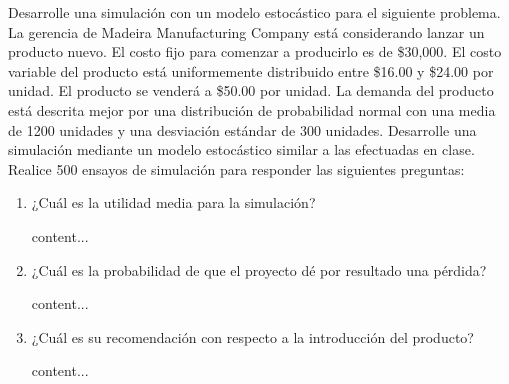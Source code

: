 \begin{problema}
	Desarrolle una simulación con un modelo estocástico para el siguiente problema. La gerencia de Madeira Manufacturing Company está considerando lanzar un producto nuevo. El costo fijo para comenzar a producirlo es de \$30,000. El costo variable del producto está uniformemente distribuido entre \$16.00 y \$24.00 por unidad. El producto se venderá a \$50.00 por unidad. La demanda del producto está descrita mejor por una distribución de probabilidad normal con una media de 1200 unidades y una desviación estándar de 300 unidades. Desarrolle una simulación mediante un modelo estocástico similar a las efectuadas en clase. Realice 500 ensayos de simulación para responder las siguientes preguntas:	
	\begin{enumerate}
		\item ¿Cuál es la utilidad media para la simulación? 	
		\begin{sol}
			content...
		\end{sol}
		\item ¿Cuál es la probabilidad de que el proyecto dé por resultado una pérdida?     
				\begin{sol}
			content...
		\end{sol}
		\item ¿Cuál es su recomendación con respecto a la introducción del producto?	
				\begin{sol}
			content...
		\end{sol}
	\end{enumerate}
\end{problema}




